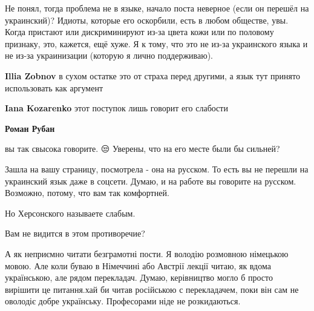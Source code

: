 \begin{itemize}
\begin{itemize}
Не понял, тогда проблема не в языке, начало поста неверное (если он перешёл на
украинский)? Идиоты, которые его оскорбили, есть в любом обществе, увы. Когда
пристают или дискриминируют из-за цвета кожи или по половому признаку, это,
кажется, ещё хуже. Я к тому, что это не из-за украинского языка и не из-за
украинизации (которую я лично поддерживаю).


 
\textbf{Illia Zobnov} в сухом остатке это от страха перед другими, а язык тут принято использовать как аргумент

 
\textbf{Iana Kozarenko} этот поступок лишь говорит его слабости

 
\textbf{Роман Рубан} 

вы так свысока говорите. 😒 Уверены, что на его месте были бы сильней?

Зашла на вашу страницу, посмотрела - она на русском. То есть вы не перешли на
украинский язык даже в соцсети. Думаю, и на работе вы говорите на русском.
Возможно, потому, что вам так комфортней.

Но Херсонского называете слабым.

Вам не видится в этом противоречие?

\end{itemize}

 
А як неприємно читати безграмотні пости. Я володію розмовною німецькою мовою.
Але коли буваю в Німеччині або Австрії лекції читаю, як вдома українською, але
рядом перекладач. Думаю, керівництво могло б просто вирішити це питання.хай би
читав російською с перекладачем, поки він сам не оволодіє добре українську.
Професорами ніде не розкидаються. 


\end{itemize}
